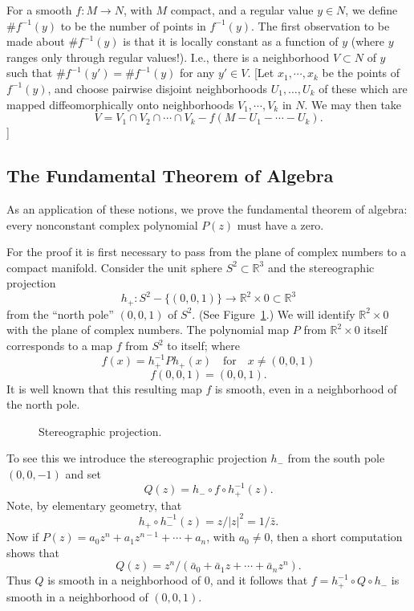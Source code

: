 For a smooth $f : M \to N$, with $M$ compact, and a regular value $y \in N$, we define $\#f^{-1}(y)$ to be the number of points in $f^{-1}(y)$. The first observation to be made about $\#f^{-1}(y)$ is that it is locally constant as a function of $y$ (where $y$ ranges only through regular values!). I.e., there is a neighborhood $V \subset N$ of $y$ such that $\#f^{-1}(y') = \#f^{-1}(y)$ for any $y' \in V$. [Let $x_1, \cdots, x_k$ be the points of $f^{-1}(y)$, and choose pairwise disjoint neighborhoods $U_1, \ldots, U_k$ of these which are mapped diffeomorphically onto neighborhoods $V_1, \cdots, V_k$ in $N$. We may then take
\[
V = V_1 \cap V_2 \cap \cdots \cap V_k - f(M - U_1 - \cdots - U_k).
\]
]

\subsection{The Fundamental Theorem of Algebra}

As an application of these notions, we prove the fundamental theorem of algebra: every nonconstant complex polynomial $P(z)$ must have a zero.

For the proof it is first necessary to pass from the plane of complex numbers to a compact manifold. Consider the unit sphere $S^2 \subset \mathbb{R}^{3}$ and the stereographic projection
\[
h_+ : S^2 - \{(0, 0, 1)\} \to \mathbb{R}^{2} \times 0 \subset \mathbb{R}^{3}
\]
from the ``north pole'' $(0, 0, 1)$ of $S^2$. (See Figure~\ref{fig:milnor-03}.) We will identify $\mathbb{R}^{2} \times 0$ with the plane of complex numbers. The polynomial map $P$ from $\mathbb{R}^{2} \times 0$ itself corresponds to a map $f$ from $S^2$ to itself; where
\[
f(x) = h_+^{-1} P h_+(x) \quad \text{for} \quad x \neq (0, 0, 1)
\]
\[
f(0, 0, 1) = (0, 0, 1).
\]
It is well known that this resulting map $f$ is smooth, even in a neighborhood of the north pole.



\begin{figure}[htbp]
\centering
\setcounter{figure}{2}%
\caption{Stereographic projection.}\label{fig:milnor-03}
\end{figure}

To see this we introduce the stereographic projection $h_-$ from the south pole $(0,0,-1)$ and set
\[
Q(z) = h_- \circ f \circ h_+^{-1}(z).
\]
Note, by elementary geometry, that
\[
h_+ \circ h_-^{-1}(z) = z/|z|^2 = 1/\bar{z}.
\]
Now if $P(z) = a_0 z^n + a_1 z^{n-1} + \cdots + a_n$, with $a_0 \neq 0$, then a short computation shows that
\[
Q(z) = z^n/(\bar{a}_0 + \bar{a}_1 z + \cdots + \bar{a}_n z^n).
\]
Thus $Q$ is smooth in a neighborhood of $0$, and it follows that $f = h_+^{-1} \circ Q \circ h_-$ is smooth in a neighborhood of $(0,0,1)$.


